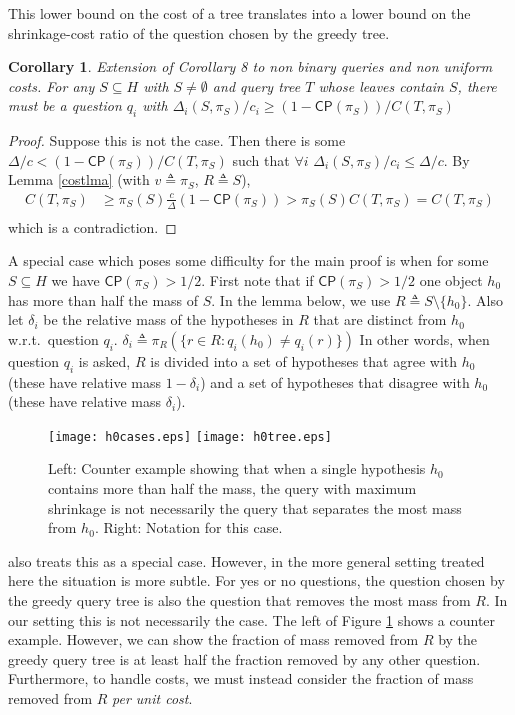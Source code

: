 \documentclass{article}
\newtheorem{corollary}{Corollary}
\begin{document}
This lower bound on the cost of a tree 
translates into a lower bound on the shrinkage-cost ratio 
of the question chosen by the greedy tree. 
\begin{corollary}Extension of Corollary 8 \citep{greedy} to non binary
queries and non uniform costs.  For any 
$S \subseteq H$ with $S \neq \emptyset$ 
and query tree $T$ whose leaves contain $S$, there
must be a question $q_i$ with  $\Delta_i(S, \pi_S) / c_i
\geq (1 - \mathsf{CP}(\pi_S)) / C(T, \pi_S)$ \label{shrinkcor} \end{corollary}
\begin{proof} 
Suppose this is not the case.  Then there is some
$\Delta/c < (1 - \mathsf{CP}(\pi_S)) / C(T, \pi_S)$ 
such that $\forall i$ $\Delta_i(S, \pi_S)/c_i \leq \Delta/c$. 
By Lemma \ref{costlma} (with $v \triangleq \pi_S$, $R \triangleq S$), 
\begin{align*}
C(T,\pi_S) & \geq \pi_S(S) \frac{c}{\Delta}(1 - \mathsf{CP}(\pi_S)) 
 > \pi_S(S) C(T,\pi_S) = C(T,\pi_S) \\
\end{align*}
which is a contradiction. 
\end{proof}

A special case which poses some difficulty for the main proof
is when for some $S \subseteq H$ we have $\mathsf{CP}(\pi_S) > 1/2$.
First note that if $\mathsf{CP}(\pi_S) > 1/2$ one object $h_0$ 
has more than half the mass of $S$.  In the lemma below,
we use $R \triangleq S \setminus \lbrace h_0 \rbrace$.  Also 
let $\delta_i$ be the relative mass of the hypotheses in $R$ that are
distinct from $h_0$ w.r.t.\ question $q_i$.
$ \delta_i \triangleq \pi_R(\lbrace r \in R : q_i(h_0) \neq q_i(r) \rbrace) $
In other words, when question $q_i$ is asked, $R$ is divided into
a set of hypotheses that agree with $h_0$ (these have relative
mass $1-\delta_i$) and a set of hypotheses that disagree with $h_0$ (these
have relative mass $\delta_i$).
\begin{figure}[t]
\centering
\texttt{[image: h0cases.eps]}
\texttt{[image: h0tree.eps]}
\caption{Left: Counter example showing that when a single hypothesis $h_0$
contains more than half the mass, the query with maximum shrinkage
is not necessarily the query that separates the most mass from $h_0$.
Right: Notation for this case.}
\label{counterfig}
\end{figure}
\citet{greedy} also treats this as a special case.  However, in
the more general setting treated here the situation is more subtle.  
For yes or no questions, the question
chosen by the greedy query tree is also the question that removes the
most mass from $R$.  In our setting this is not necessarily the case.
The left of Figure \ref{counterfig} shows a counter example.  
However, we can show the fraction of mass removed from $R$ by the
greedy query tree is at least half the fraction removed by any other
question.  Furthermore, to handle costs, we must instead consider the
fraction of mass removed from $R$ \emph{per unit cost}.
\end{document}
